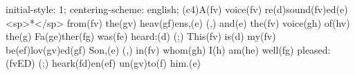 initial-style: 1;
centering-scheme: english;
(c4)A(fv) voice(fv) re(d)sound(fv)ed(e) <sp>*</sp> from(fv) the(gv) heav(gf)ens,(e) (,) and(e) the(fv) voice(gh) of(hv) the(g) Fa(ge)ther(fg) was(fe) heard:(d) (;) This(fv) is(d) my(fv) be(ef)lov(gv)ed(gf) Son,(e) (,) in(fv) whom(gh) I(h) am(he) well(fg) pleased:(fvED) (;) heark(fd)en(ef) un(gv)to(f) him.(e)
